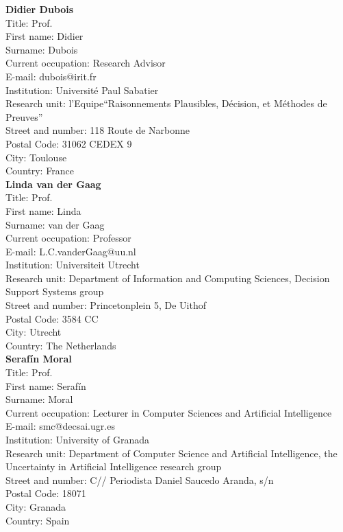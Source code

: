 \documentclass[11pt,dvipsnames,usenames,a4paper]{article}
\begin{document}
{\bf Didier Dubois}\\
Title: Prof.\\
First name: Didier\\
Surname:  Dubois \\
Current occupation: Research Advisor\\
E-mail: dubois@irit.fr\\
Institution: Universit\'e Paul Sabatier\\
Research unit: l'Equipe``Raisonnements Plausibles, Décision, et Méthodes de Preuves''\\
Street and number: 118 Route de Narbonne\\
Postal Code: 31062 CEDEX 9\\
City: Toulouse\\
Country: France\\[-7pt]

{\bf Linda van der Gaag}\\
Title: Prof.\\
First name: Linda\\
Surname:  van der Gaag\\
Current occupation: Professor\\
E-mail: L.C.vanderGaag@uu.nl\\
Institution: Universiteit Utrecht\\
Research unit: Department of Information and Computing Sciences, Decision Support Systems group\\
Street and number: Princetonplein 5, De Uithof\\
Postal Code: 3584 CC\\
City: Utrecht\\
Country: The Netherlands\\[-7pt]

{\bf Seraf\'in Moral}\\
Title: Prof.\\
First name: Seraf\'in\\
Surname:  Moral \\
Current occupation: Lecturer in Computer Sciences and Artificial Intelligence\\
E-mail: smc@decsai.ugr.es\\
Institution: University of Granada\\
Research unit: Department of Computer Science and Artificial Intelligence, the Uncertainty in Artificial Intelligence research group\\
Street and number: C// Periodista Daniel Saucedo Aranda, s/n\\
Postal Code: 18071\\
City: Granada\\
Country: Spain\\[-7pt]
\end{document}
